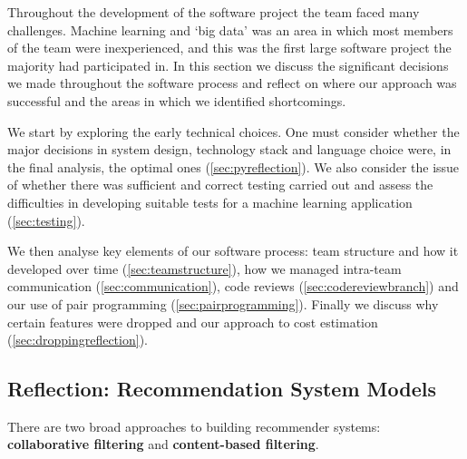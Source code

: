 \documentclass{l3proj}
\begin{document}
Throughout the development of the software project the team faced many challenges. Machine learning and ‘big data’ was an area in which most members of the team were inexperienced, and this was the first large software project the majority had participated in. In this section we discuss the significant decisions we made throughout the software process and reflect on where our approach was successful and the areas in which we identified shortcomings. 

We start by exploring the early technical choices. One must consider whether the major decisions in system design, technology stack and language choice were, in the final analysis, the optimal ones (\ref{sec:pyreflection}). We also consider the issue of whether there was sufficient and correct testing carried out and assess the difficulties in developing suitable tests for a machine learning application (\ref{sec:testing}).

We then analyse key elements of our software process: team structure and how it developed over time (\ref{sec:teamstructure}), how we managed intra-team communication  (\ref{sec:communication}), code reviews (\ref{sec:codereviewbranch}) and our use of pair programming (\ref{sec:pairprogramming}). Finally we discuss why certain features were dropped and our approach to cost estimation (\ref{sec:droppingreflection}).

\subsection{Reflection: Recommendation System Models}
\label{sec:modelreflection}

There are two broad approaches to building recommender systems: \textbf{collaborative filtering} and \textbf{content-based filtering}. 
\end{document}
